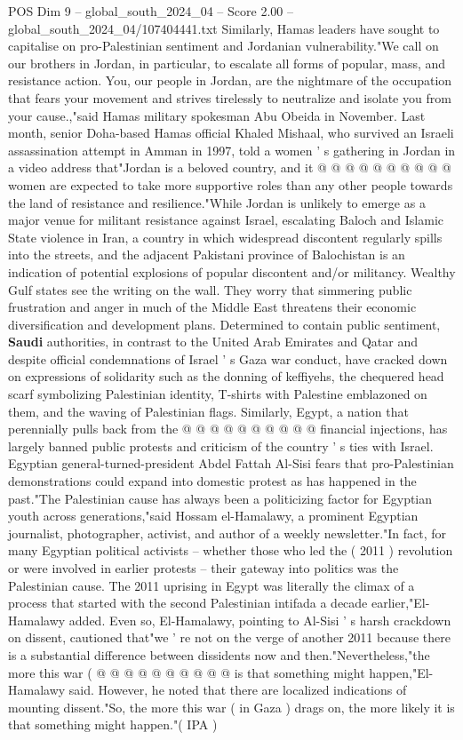 \begin{textsample}{POS Dim 9 – global\_south\_2024\_04 – Score 2.00 – global\_south\_2024\_04/107404441.txt}
Similarly, Hamas leaders have sought to capitalise on pro-Palestinian sentiment and Jordanian vulnerability."We call on our brothers in Jordan, in particular, to escalate all forms of popular, mass, and resistance action.
You, our people in Jordan, are the nightmare of the occupation that fears your movement and strives tirelessly to neutralize and isolate you from your cause.,"said Hamas military spokesman Abu Obeida in November.
Last month, senior Doha-based Hamas official Khaled Mishaal, who survived an Israeli assassination attempt in Amman in 1997, told a women ' s gathering in Jordan in a video address that"Jordan is a beloved country, and it @ @ @ @ @ @ @ @ @ @ women are expected to take more supportive roles than any other people towards the land of resistance and resilience."While Jordan is unlikely to emerge as a major venue for militant resistance against Israel, escalating Baloch and Islamic State violence in Iran, a country in which widespread discontent regularly spills into the streets, and the adjacent Pakistani province of Balochistan is an indication of potential explosions of popular discontent and/or militancy.
Wealthy Gulf states see the writing on the wall.
They worry that simmering public frustration and anger in much of the Middle East threatens their economic diversification and development plans.
Determined to contain public sentiment, \textbf{Saudi} authorities, in contrast to the United Arab Emirates and Qatar and despite official condemnations of Israel ' s Gaza war conduct, have cracked down on expressions of solidarity such as the donning of keffiyehs, the chequered head scarf symbolizing Palestinian identity, T-shirts with Palestine emblazoned on them, and the waving of Palestinian flags.
Similarly, Egypt, a nation that perennially pulls back from the @ @ @ @ @ @ @ @ @ @ financial injections, has largely banned public protests and criticism of the country ' s ties with Israel.
Egyptian general-turned-president Abdel Fattah Al-Sisi fears that pro-Palestinian demonstrations could expand into domestic protest as has happened in the past."The Palestinian cause has always been a politicizing factor for Egyptian youth across generations,"said Hossam el-Hamalawy, a prominent Egyptian journalist, photographer, activist, and author of a weekly newsletter."In fact, for many Egyptian political activists -- whether those who led the ( 2011 ) revolution or were involved in earlier protests -- their gateway into politics was the Palestinian cause.
The 2011 uprising in Egypt was literally the climax of a process that started with the second Palestinian intifada a decade earlier,"El-Hamalawy added.
Even so, El-Hamalawy, pointing to Al-Sisi ' s harsh crackdown on dissent, cautioned that"we ' re not on the verge of another 2011 because there is a substantial difference between dissidents now and then."Nevertheless,"the more this war ( @ @ @ @ @ @ @ @ @ @ is that something might happen,"El-Hamalawy said.
However, he noted that there are localized indications of mounting dissent."So, the more this war ( in Gaza ) drags on, the more likely it is that something might happen."( IPA )

\end{textsample}
